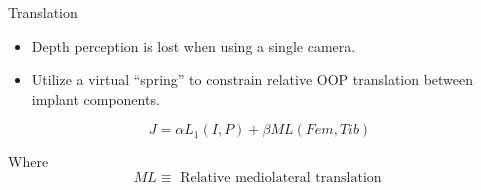 \documentclass[presentation, aspectratio=1610]{beamer}
\begin{document}
\begin{frame}[label={sec:org08d48f5}]{Translation}
\begin{itemize}
\item Depth perception is lost when using a single camera.
\item Utilize a virtual ``spring'' to constrain relative OOP translation between implant components.
\end{itemize}

\begin{equation*}
  J = \alpha L_{1}(I,P) + \beta ML(Fem,Tib)
\end{equation*}

Where
\begin{equation*}
  ML \equiv \text{ Relative mediolateral translation }
\end{equation*}
\end{frame}
\end{document}
